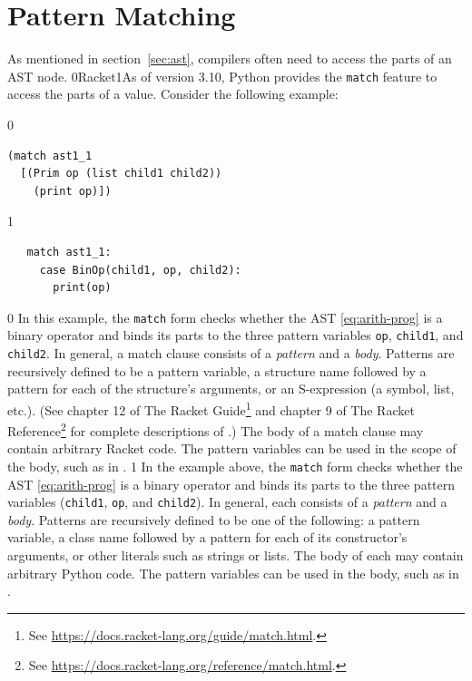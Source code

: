 \documentclass[7x10]{TimesAPriori_MIT}%
\def\racketEd{0}
\def\pythonEd{1}
\providecommand{\BookEdition}{1}
\let\edition\BookEdition
\newcommand{\racket}[1]{{\if\edition\racketEd{#1}\fi}}
\newcommand{\pythonColor}[0]{}
\newcommand{\python}[1]{{\if\edition\pythonEd\pythonColor #1\fi}}
\numberwithin{theorem}{chapter}
\numberwithin{definition}{chapter}
\numberwithin{equation}{chapter}
\begin{document}
\section{Pattern Matching}
\label{sec:pattern-matching}

As mentioned in section~\ref{sec:ast}, compilers often need to access
the parts of an AST node. \racket{Racket}\python{As of version 3.10, Python}
provides the \texttt{match} feature to access the parts of a value.
Consider the following example:  
\begin{center}
\begin{minipage}{1.0\textwidth}
{\if\edition\racketEd
\begin{lstlisting}
(match ast1_1
  [(Prim op (list child1 child2))
    (print op)])
\end{lstlisting}
\fi}
{\if\edition\pythonEd\pythonColor
\begin{lstlisting}
   match ast1_1:
     case BinOp(child1, op, child2):
       print(op)
\end{lstlisting}
\fi}  
\end{minipage}
\end{center}

{\if\edition\racketEd
%
In this example, the \texttt{match} form checks whether the AST
\eqref{eq:arith-prog} is a binary operator and binds its parts to the
three pattern variables \texttt{op}, \texttt{child1}, and
\texttt{child2}. In general, a match clause consists of a
\emph{pattern} and a \emph{body}. Patterns are
recursively defined to be a pattern variable, a structure name
followed by a pattern for each of the structure's arguments, or an
S-expression (a symbol, list, etc.).  (See chapter 12 of The Racket
Guide\footnote{See \url{https://docs.racket-lang.org/guide/match.html}.}
and chapter 9 of The Racket
Reference\footnote{See \url{https://docs.racket-lang.org/reference/match.html}.}
for complete descriptions of .)
%
The body of a match clause may contain arbitrary Racket code.  The
pattern variables can be used in the scope of the body, such as
 in .
%
\fi}
%
%
{\if\edition\pythonEd\pythonColor
%  
In the example above, the \texttt{match} form checks whether the AST
\eqref{eq:arith-prog} is a binary operator and binds its parts to the
three pattern variables (\texttt{child1}, \texttt{op}, and
\texttt{child2}). In general, each  consists of a
\emph{pattern} and a \emph{body}. Patterns are
recursively defined to be one of the following: a pattern variable, a
class name followed by a pattern for each of its constructor's
arguments, or other literals such as strings
or lists.
%
The body of each  may contain arbitrary Python code. The
pattern variables can be used in the body, such as  in
.
%
\fi}
\end{document}
